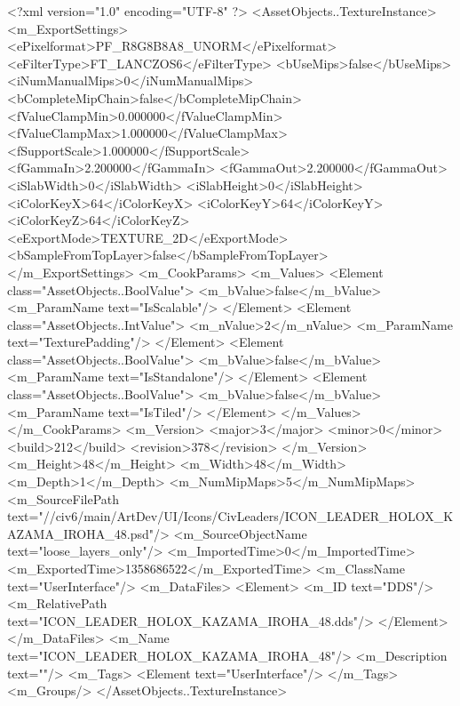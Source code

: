 <?xml version="1.0" encoding="UTF-8" ?>
<AssetObjects..TextureInstance>
	<m_ExportSettings>
		<ePixelformat>PF_R8G8B8A8_UNORM</ePixelformat>
		<eFilterType>FT_LANCZOS6</eFilterType>
		<bUseMips>false</bUseMips>
		<iNumManualMips>0</iNumManualMips>
		<bCompleteMipChain>false</bCompleteMipChain>
		<fValueClampMin>0.000000</fValueClampMin>
		<fValueClampMax>1.000000</fValueClampMax>
		<fSupportScale>1.000000</fSupportScale>
		<fGammaIn>2.200000</fGammaIn>
		<fGammaOut>2.200000</fGammaOut>
		<iSlabWidth>0</iSlabWidth>
		<iSlabHeight>0</iSlabHeight>
		<iColorKeyX>64</iColorKeyX>
		<iColorKeyY>64</iColorKeyY>
		<iColorKeyZ>64</iColorKeyZ>
		<eExportMode>TEXTURE_2D</eExportMode>
		<bSampleFromTopLayer>false</bSampleFromTopLayer>
	</m_ExportSettings>
	<m_CookParams>
		<m_Values>
			<Element class="AssetObjects..BoolValue">
				<m_bValue>false</m_bValue>
				<m_ParamName text="IsScalable"/>
			</Element>
			<Element class="AssetObjects..IntValue">
				<m_nValue>2</m_nValue>
				<m_ParamName text="TexturePadding"/>
			</Element>
			<Element class="AssetObjects..BoolValue">
				<m_bValue>false</m_bValue>
				<m_ParamName text="IsStandalone"/>
			</Element>
			<Element class="AssetObjects..BoolValue">
				<m_bValue>false</m_bValue>
				<m_ParamName text="IsTiled"/>
			</Element>
		</m_Values>
	</m_CookParams>
	<m_Version>
		<major>3</major>
		<minor>0</minor>
		<build>212</build>
		<revision>378</revision>
	</m_Version>
	<m_Height>48</m_Height>
	<m_Width>48</m_Width>
	<m_Depth>1</m_Depth>
	<m_NumMipMaps>5</m_NumMipMaps>
	<m_SourceFilePath text="//civ6/main/ArtDev/UI/Icons/CivLeaders/ICON_LEADER_HOLOX_KAZAMA_IROHA_48.psd"/>
	<m_SourceObjectName text="loose_layers_only"/>
	<m_ImportedTime>0</m_ImportedTime>
	<m_ExportedTime>1358686522</m_ExportedTime>
	<m_ClassName text="UserInterface"/>
	<m_DataFiles>
		<Element>
			<m_ID text="DDS"/>
			<m_RelativePath text="ICON_LEADER_HOLOX_KAZAMA_IROHA_48.dds"/>
		</Element>
	</m_DataFiles>
	<m_Name text="ICON_LEADER_HOLOX_KAZAMA_IROHA_48"/>
	<m_Description text=""/>
	<m_Tags>
		<Element text="UserInterface"/>
	</m_Tags>
	<m_Groups/>
</AssetObjects..TextureInstance>

